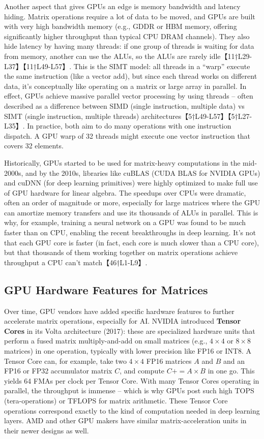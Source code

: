 Another aspect that gives GPUs an edge is memory bandwidth and latency hiding. Matrix operations require a lot of data to be moved, and GPUs are built with very high bandwidth memory (e.g., GDDR or HBM memory, offering significantly higher throughput than typical CPU DRAM channels). They also hide latency by having many threads: if one group of threads is waiting for data from memory, another can use the ALUs, so the ALUs are rarely idle【11†L29-L37】【11†L49-L57】. This is the SIMT model: all threads in a “warp” execute the same instruction (like a vector add), but since each thread works on different data, it’s conceptually like operating on a matrix or large array in parallel. In effect, GPUs achieve massive parallel vector processing by using threads – often described as a difference between SIMD (single instruction, multiple data) vs SIMT (single instruction, multiple threads) architectures【5†L49-L57】【5†L27-L35】. In practice, both aim to do many operations with one instruction dispatch. A GPU warp of 32 threads might execute one vector instruction that covers 32 elements.

Historically, GPUs started to be used for matrix-heavy computations in the mid-2000s, and by the 2010s, libraries like cuBLAS (CUDA BLAS for NVIDIA GPUs) and cuDNN (for deep learning primitives) were highly optimized to make full use of GPU hardware for linear algebra. The speedups over CPUs were dramatic, often an order of magnitude or more, especially for large matrices where the GPU can amortize memory transfers and use its thousands of ALUs in parallel. This is why, for example, training a neural network on a GPU was found to be much faster than on CPU, enabling the recent breakthroughs in deep learning. It’s not that each GPU core is faster (in fact, each core is much slower than a CPU core), but that thousands of them working together on matrix operations achieve throughput a CPU can’t match【46†L1-L9】.

\subsection{GPU Hardware Features for Matrices}  
Over time, GPU vendors have added specific hardware features to further accelerate matrix operations, especially for AI. NVIDIA introduced \textbf{Tensor Cores} in its Volta architecture (2017): these are specialized hardware units that perform a fused matrix multiply-and-add on small matrices (e.g., $4 \times 4$ or $8 \times 8$ matrices) in one operation, typically with lower precision like FP16 or INT8. A Tensor Core can, for example, take two $4\times4$ FP16 matrices $A$ and $B$ and an FP16 or FP32 accumulator matrix $C$, and compute $C += A \times B$ in one go. This yields 64 FMAs per clock per Tensor Core. With many Tensor Cores operating in parallel, the throughput is immense – which is why GPUs post such high TOPS (tera-operations) or TFLOPS for matrix arithmetic. These Tensor Core operations correspond exactly to the kind of computation needed in deep learning layers. AMD and other GPU makers have similar matrix-acceleration units in their newer designs as well.

